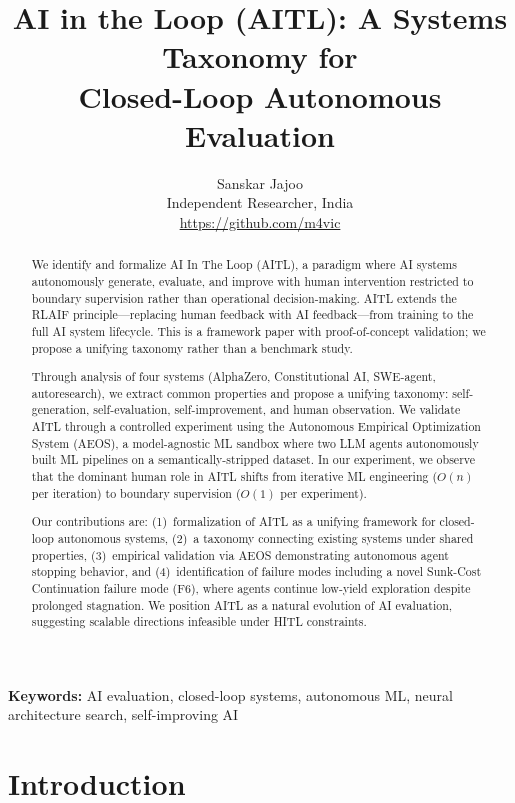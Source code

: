 \documentclass[11pt]{article}
\title{AI in the Loop (AITL): A Systems Taxonomy for\\Closed-Loop Autonomous Evaluation}
\author{
  Sanskar Jajoo\\
  Independent Researcher, India\\
  \url{https://github.com/m4vic}
}
\date{}
\begin{document}
\maketitle

\begin{abstract}
We identify and formalize AI In The Loop (AITL), a paradigm where AI systems autonomously generate, evaluate, and improve with human intervention restricted to boundary supervision rather than operational decision-making. AITL extends the RLAIF principle---replacing human feedback with AI feedback---from training to the full AI system lifecycle. This is a framework paper with proof-of-concept validation; we propose a unifying taxonomy rather than a benchmark study.

Through analysis of four systems (AlphaZero, Constitutional AI, SWE-agent, autoresearch), we extract common properties and propose a unifying taxonomy: self-generation, self-evaluation, self-improvement, and human observation. We validate AITL through a controlled experiment using the Autonomous Empirical Optimization System (AEOS), a model-agnostic ML sandbox where two LLM agents autonomously built ML pipelines on a semantically-stripped dataset. In our experiment, we observe that the dominant human role in AITL shifts from iterative ML engineering ($O(n)$ per iteration) to boundary supervision ($O(1)$ per experiment).

Our contributions are: (1)~formalization of AITL as a unifying framework for closed-loop autonomous systems, (2)~a taxonomy connecting existing systems under shared properties, (3)~empirical validation via AEOS demonstrating autonomous agent stopping behavior, and (4)~identification of failure modes including a novel Sunk-Cost Continuation failure mode (F6), where agents continue low-yield exploration despite prolonged stagnation. We position AITL as a natural evolution of AI evaluation, suggesting scalable directions infeasible under HITL constraints.
\end{abstract}

\noindent\textbf{Keywords:} AI evaluation, closed-loop systems, autonomous ML, neural architecture search, self-improving AI

\section{Introduction}
\label{sec:intro}
\end{document}
